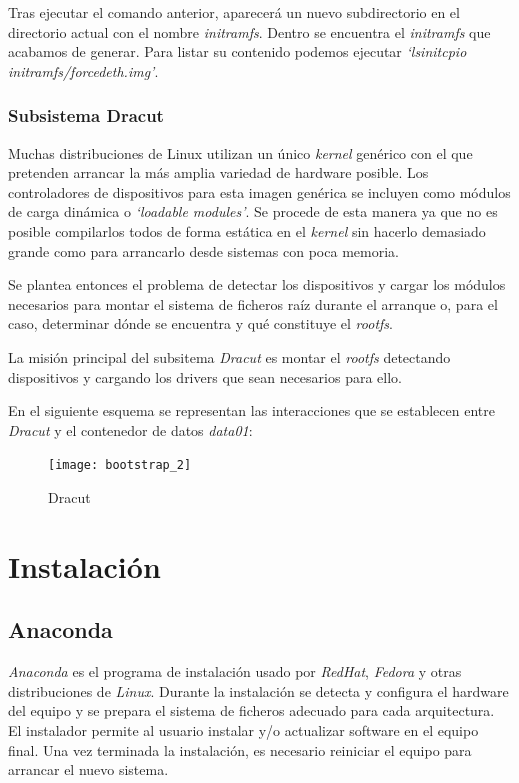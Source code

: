 \documentclass[a4paper,12pt,spanish,final]{epsc_tfc_pfc}
\begin{document}
Tras ejecutar el comando anterior, aparecerá un nuevo subdirectorio en el directorio actual con el nombre \emph{initramfs}. Dentro se encuentra el \emph{initramfs} que acabamos de generar. Para listar su contenido podemos ejecutar \emph{`lsinitcpio initramfs/forcedeth.img'}.

\subsubsection{Subsistema Dracut}
Muchas distribuciones de Linux utilizan un único \emph{kernel} genérico con el que pretenden arrancar la más amplia variedad de hardware posible.
Los controladores de dispositivos para esta imagen genérica se incluyen como módulos de carga dinámica o \emph{`loadable modules'}. Se procede de esta manera ya que no es posible compilarlos todos de forma estática en el \emph{kernel} sin hacerlo demasiado grande como para arrancarlo desde sistemas con poca memoria.

Se plantea entonces el problema de detectar los dispositivos y cargar los módulos necesarios para montar el sistema de ficheros raíz durante el arranque o, para el caso, determinar dónde se encuentra y qué constituye el \emph{rootfs}.

La misión principal del subsitema \emph{Dracut} es montar el \emph{rootfs} detectando dispositivos y cargando los drivers que sean necesarios para ello.

En el siguiente esquema se representan las interacciones que se establecen entre \emph{Dracut} y el contenedor de datos \emph{data01}:\\

\begin{figure}[h]
  \centering
    \texttt{[image: bootstrap\_2]}
      \caption{Dracut}
\end{figure}

\section{Instalación}

\subsection{Anaconda}

\emph{Anaconda} es el programa de instalación usado por \emph{RedHat}, \emph{Fedora} y otras distribuciones de \emph{Linux}. Durante la instalación se detecta y configura el hardware del equipo y se prepara el sistema de ficheros adecuado para cada arquitectura. El instalador permite al usuario instalar y/o actualizar software en el equipo final. Una vez terminada la instalación, es necesario reiniciar el equipo para arrancar el nuevo sistema.
\end{document}
